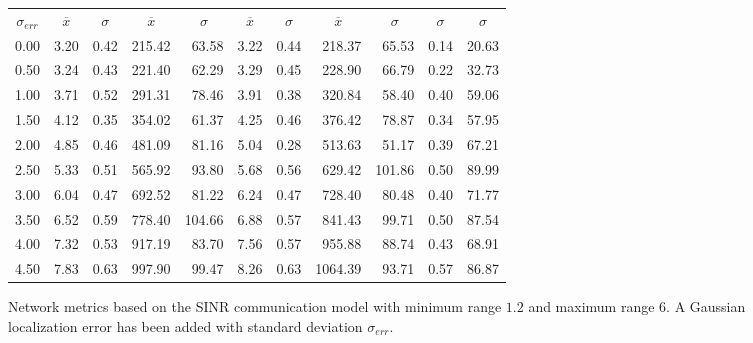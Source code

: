 \documentclass{article}
\begin{document}
\begin{figure}[h]
\begin{center}
\begin{tabular}{|r|rr|rr|rr|rr|rr|}
\hline
\multicolumn{1}{|c|}{$\sigma_{err}$} & \multicolumn{1}{|c}{$\overline{x}$} & \multicolumn{1}{c|}{$\sigma$} & \multicolumn{1}{|c}{$\overline{x}$} & \multicolumn{1}{c|}{$\sigma$} & \multicolumn{1}{|c}{$\overline{x}$} & \multicolumn{1}{c|}{$\sigma$} & \multicolumn{1}{|c}{$\overline{x}$} & \multicolumn{1}{c|}{$\sigma$} & \multicolumn{1}{|c}{$\sigma$} & \multicolumn{1}{c|}{$\sigma$}\\
0.00 & 3.20 & 0.42 & 215.42 & 63.58 & 3.22 & 0.44 & 218.37 & 65.53 & 0.14 & 20.63\\
0.50 & 3.24 & 0.43 & 221.40 & 62.29 & 3.29 & 0.45 & 228.90 & 66.79 & 0.22 & 32.73\\
1.00 & 3.71 & 0.52 & 291.31 & 78.46 & 3.91 & 0.38 & 320.84 & 58.40 & 0.40 & 59.06\\
1.50 & 4.12 & 0.35 & 354.02 & 61.37 & 4.25 & 0.46 & 376.42 & 78.87 & 0.34 & 57.95\\
2.00 & 4.85 & 0.46 & 481.09 & 81.16 & 5.04 & 0.28 & 513.63 & 51.17 & 0.39 & 67.21\\
2.50 & 5.33 & 0.51 & 565.92 & 93.80 & 5.68 & 0.56 & 629.42 & 101.86 & 0.50 & 89.99\\
3.00 & 6.04 & 0.47 & 692.52 & 81.22 & 6.24 & 0.47 & 728.40 & 80.48 & 0.40 & 71.77\\
3.50 & 6.52 & 0.59 & 778.40 & 104.66 & 6.88 & 0.57 & 841.43 & 99.71 & 0.50 & 87.54\\
4.00 & 7.32 & 0.53 & 917.19 & 83.70 & 7.56 & 0.57 & 955.88 & 88.74 & 0.43 & 68.91\\
4.50 & 7.83 & 0.63 & 997.90 & 99.47 & 8.26 & 0.63 & 1064.39 & 93.71 & 0.57 & 86.87\\
\hline
\end{tabular}
\caption{Network metrics based on the SINR communication model with minimum range $1.2$ and maximum range $6$. A Gaussian localization error has been added with standard deviation $\sigma_{err}$.}
\label{exp_sinr_e}
\end{center}
\end{figure}
\end{document}
